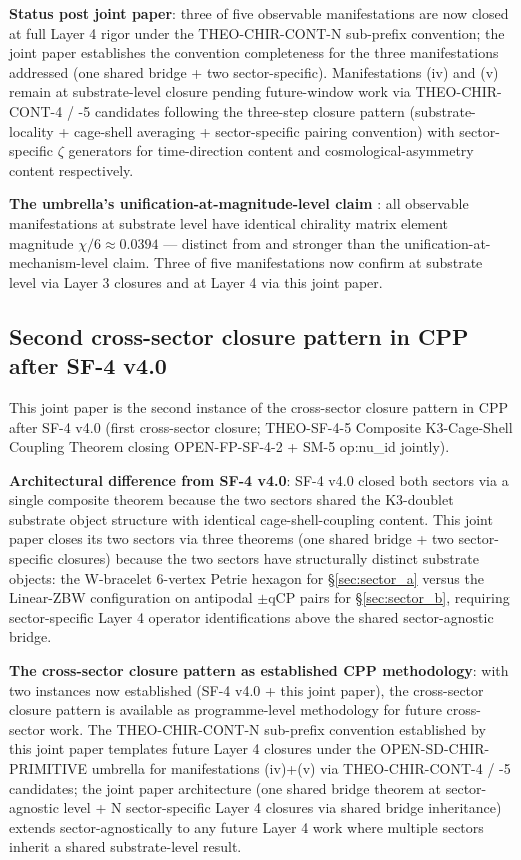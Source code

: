 \documentclass[11pt,letterpaper]{article}
\begin{document}
\textbf{Status post joint paper}: three of five observable manifestations are now closed at full Layer 4 rigor under the THEO-CHIR-CONT-N sub-prefix convention; the joint paper establishes the convention completeness for the three manifestations addressed (one shared bridge + two sector-specific). Manifestations (iv) and (v) remain at substrate-level closure pending future-window work via THEO-CHIR-CONT-4 / -5 candidates following the three-step closure pattern (substrate-locality + cage-shell averaging + sector-specific pairing convention) with sector-specific $\zeta$ generators for time-direction content and cosmological-asymmetry content respectively.

\textbf{The umbrella's unification-at-magnitude-level claim} \cite{Capotauro}: all observable manifestations at substrate level have identical chirality matrix element magnitude $\chi/6 \approx 0.0394$ --- distinct from and stronger than the unification-at-mechanism-level claim. Three of five manifestations now confirm at substrate level via Layer 3 closures and at Layer 4 via this joint paper.

\subsection{Second cross-sector closure pattern in CPP after SF-4 v4.0}
\label{sec:second_cross_sector_pattern}

This joint paper is the second instance of the cross-sector closure pattern in CPP after SF-4 v4.0 \cite{SF4v4} (first cross-sector closure; THEO-SF-4-5 Composite K3-Cage-Shell Coupling Theorem closing OPEN-FP-SF-4-2 + SM-5 op:nu\_id jointly).

\textbf{Architectural difference from SF-4 v4.0}: SF-4 v4.0 closed both sectors via a single composite theorem because the two sectors shared the K3-doublet substrate object structure with identical cage-shell-coupling content. This joint paper closes its two sectors via three theorems (one shared bridge + two sector-specific closures) because the two sectors have structurally distinct substrate objects: the W-bracelet 6-vertex Petrie hexagon for §\ref{sec:sector_a} versus the Linear-ZBW configuration on antipodal $\pm$qCP pairs for §\ref{sec:sector_b}, requiring sector-specific Layer 4 operator identifications above the shared sector-agnostic bridge.

\textbf{The cross-sector closure pattern as established CPP methodology}: with two instances now established (SF-4 v4.0 + this joint paper), the cross-sector closure pattern is available as programme-level methodology for future cross-sector work. The THEO-CHIR-CONT-N sub-prefix convention established by this joint paper templates future Layer 4 closures under the OPEN-SD-CHIR-PRIMITIVE umbrella for manifestations (iv)+(v) via THEO-CHIR-CONT-4 / -5 candidates; the joint paper architecture (one shared bridge theorem at sector-agnostic level + N sector-specific Layer 4 closures via shared bridge inheritance) extends sector-agnostically to any future Layer 4 work where multiple sectors inherit a shared substrate-level result.
\end{document}

